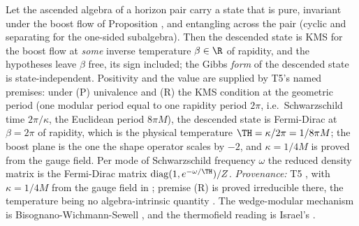 Let the ascended algebra of a horizon pair carry a state that is pure, invariant under the boost flow of Proposition , and entangling across the pair (cyclic and separating for the one-sided subalgebra). Then the descended state is KMS for the boost flow at \emph{some} inverse temperature $\beta \in \R$ of rapidity, and the hypotheses leave $\beta$ free, its sign included; the Gibbs \emph{form} of the descended state is state-independent. Positivity and the value are supplied by T5's named premises: under (P) univalence and (R) the KMS condition at the geometric period (one modular period equal to one rapidity period $2\pi$, i.e.\ Schwarzschild time $2\pi/\kappa$, the Euclidean period $8\pi M$), the descended state is Fermi-Dirac at $\beta = 2\pi$ of rapidity, which is the physical temperature $\TH = \kappa/2\pi = 1/8\pi M$; the boost plane is the one the shape operator scales by $-2$, and $\kappa = 1/4M$ is proved from the gauge field. Per mode of Schwarzschild frequency $\omega$ the reduced density matrix is the Fermi-Dirac matrix $\mathrm{diag}(1, e^{-\omega/\TH})/Z$. \emph{Provenance:} T5 \cite[Thms.~7.3 and 7.6, Prems.~7.8 and 7.19, Prop.~7.18, Thm.~7.20, Cor.~6.4]{ButlerT5}, with $\kappa = 1/4M$ from the gauge field in \cite[App.~A]{ButlerT5}; premise (R) is proved irreducible there, the temperature being no algebra-intrinsic quantity \cite[Thm.~7.16]{ButlerT5}. The wedge-modular mechanism is Bisognano-Wichmann-Sewell \cite{BisognanoWichmann1976, Sewell1982}, and the thermofield reading is Israel's \cite{Israel1976}.
